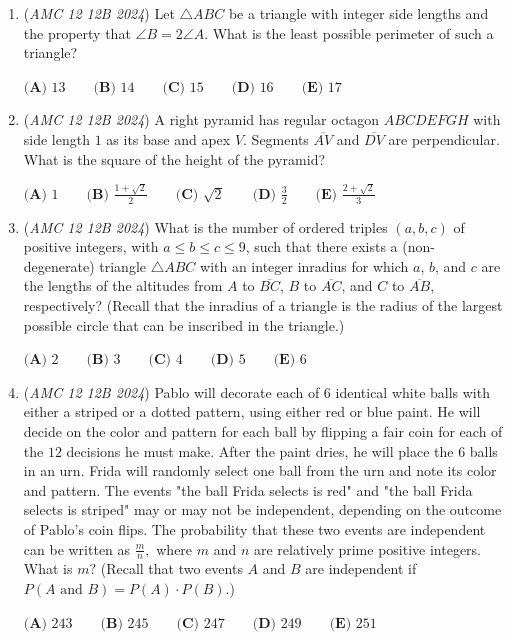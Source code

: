 \begin{enumerate}
 $\textbf{(A) }40 \qquad \textbf{(B) }126 \qquad \textbf{(C) }154 \qquad \textbf{(D) }176 \qquad \textbf{(E) }208 \qquad$


	\item (\textit{AMC 12 12B 2024}) Let $\triangle ABC$ be a triangle with integer side lengths and the property that $\angle{B} = 2\angle{A}$. What is the least possible perimeter of such a triangle?


 $\textbf{(A) }13 \qquad \textbf{(B) }14 \qquad \textbf{(C) }15 \qquad \textbf{(D) }16 \qquad \textbf{(E) }17 \qquad$


	\item (\textit{AMC 12 12B 2024}) A right pyramid has regular octagon $ABCDEFGH$ with side length $1$ as its base and apex $V.$ Segments $\overline{AV}$ and $\overline{DV}$ are perpendicular. What is the square of the height of the pyramid?


 $\textbf{(A) }1 \qquad \textbf{(B) }\frac{1+\sqrt2}{2} \qquad \textbf{(C) }\sqrt2 \qquad \textbf{(D) }\frac32 \qquad \textbf{(E) }\frac{2+\sqrt2}{3} \qquad$


	\item (\textit{AMC 12 12B 2024}) What is the number of ordered triples $(a,b,c)$ of positive integers, with $a\le b\le c\le 9$, such that there exists a (non-degenerate) triangle $\triangle ABC$ with an integer inradius for which $a$, $b$, and $c$ are the lengths of the altitudes from $A$ to $\overline{BC}$, $B$ to $\overline{AC}$, and $C$ to $\overline{AB}$, respectively? (Recall that the inradius of a triangle is the radius of the largest possible circle that can be inscribed in the triangle.)


 $\textbf{(A) }2\qquad \textbf{(B) }3\qquad \textbf{(C) }4\qquad \textbf{(D) }5\qquad \textbf{(E) }6\qquad$


	\item (\textit{AMC 12 12B 2024}) Pablo will decorate each of $6$ identical white balls with either a striped or a dotted pattern, using either red or blue paint. He will decide on the color and pattern for each ball by flipping a fair coin for each of the $12$ decisions he must make. After the paint dries, he will place the $6$ balls in an urn. Frida will randomly select one ball from the urn and note its color and pattern. The events "the ball Frida selects is red" and "the ball Frida selects is striped" may or may not be independent, depending on the outcome of Pablo's coin flips. The probability that these two events are independent can be written as $\frac mn,$ where $m$ and $n$ are relatively prime positive integers. What is $m?$ (Recall that two events $A$ and $B$ are independent if $P(A \text{ and }B) = P(A) \cdot P(B).$)


 $\textbf{(A) } 243 \qquad \textbf{(B) } 245 \qquad \textbf{(C) } 247 \qquad \textbf{(D) } 249\qquad \textbf{(E) } 251$


\end{enumerate}